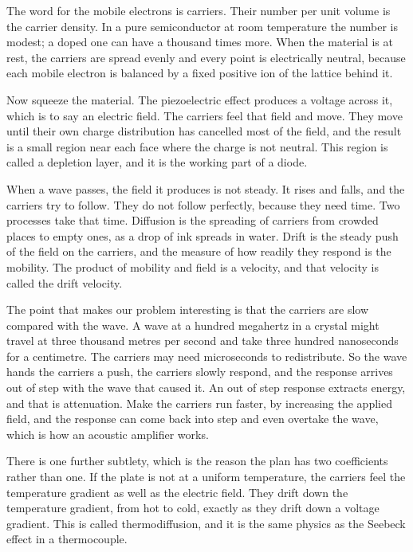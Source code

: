 \documentclass[11pt]{article}
\begin{document}
The word for the mobile electrons is carriers. Their number per unit volume is the carrier density. In a pure
semiconductor at room temperature the number is modest; a doped one can have a thousand times more. When the
material is at rest, the carriers are spread evenly and every point is electrically neutral, because each
mobile electron is balanced by a fixed positive ion of the lattice behind it.

Now squeeze the material. The piezoelectric effect produces a voltage across it, which is to say an electric
field. The carriers feel that field and move. They move until their own charge distribution has cancelled
most of the field, and the result is a small region near each face where the charge is not neutral. This
region is called a depletion layer, and it is the working part of a diode.

When a wave passes, the field it produces is not steady. It rises and falls, and the carriers try to follow.
They do not follow perfectly, because they need time. Two processes take that time. Diffusion is the spreading
of carriers from crowded places to empty ones, as a drop of ink spreads in water. Drift is the steady push of
the field on the carriers, and the measure of how readily they respond is the mobility. The product of
mobility and field is a velocity, and that velocity is called the drift velocity.

The point that makes our problem interesting is that the carriers are slow compared with the wave. A wave at
a hundred megahertz in a crystal might travel at three thousand metres per second and take three hundred
nanoseconds for a centimetre. The carriers may need microseconds to redistribute. So the wave hands the
carriers a push, the carriers slowly respond, and the response arrives out of step with the wave that caused
it. An out of step response extracts energy, and that is attenuation. Make the carriers run faster, by
increasing the applied field, and the response can come back into step and even overtake the wave, which is
how an acoustic amplifier works.

There is one further subtlety, which is the reason the plan has two coefficients rather than one. If the
plate is not at a uniform temperature, the carriers feel the temperature gradient as well as the electric
field. They drift down the temperature gradient, from hot to cold, exactly as they drift down a voltage
gradient. This is called thermodiffusion, and it is the same physics as the Seebeck effect in a thermocouple.
\end{document}
